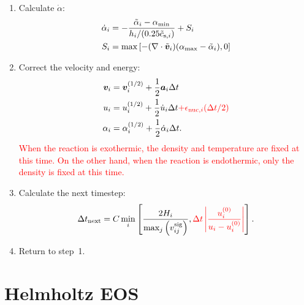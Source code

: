 \documentclass[fleqn,dvipdfmx]{article}
\newcommand{\redtext}[1]{\textcolor{red}{#1}}
\begin{document}
\begin{enumerate}
\item Calculate $\dot{\alpha}$:
  \begin{align}
    \dot{\alpha}_i &= - \frac{\tilde{\alpha}_i - \alpha_{\rm
        min}}{h_i/(0.25\tilde{c}_{{\rm s},i})} + S_i \\ 
    S_i &= \max \left[ -(\nabla \cdot \tilde{\bm{v}}_i)(\alpha_{\rm
        max}-\tilde{\alpha}_i), 0 \right]
  \end{align}

\item Correct the velocity and energy:
  \begin{align}
    \bm{v}_i &= \bm{v}^{(1/2)}_i + \frac{1}{2} \bm{a}_i \Delta t \\
    u_i &= u^{(1/2)}_i + \frac{1}{2} \dot{u}_i \Delta t \redtext{+
      \epsilon_{{\rm nuc},i}(\Delta t / 2)} \\
    \alpha_i &= \alpha^{(1/2)}_i + \frac{1}{2} \dot{\alpha}_i \Delta
    t.
  \end{align}
  \redtext{When the reaction is exothermic, the density and
    temperature are fixed at this time. On the other hand, when the
    reaction is endothermic, only the density is fixed at this time.}

\item Calculate the next timestep:
  \begin{align}
    \Delta t_{\rm next} = C \min_i \left[ \frac{2H_i}{\max_j \left(
        v_{ij}^{\rm sig} \right) }, \redtext{\Delta t \left|
        \frac{u_i^{(0)}}{u_i-u_i^{(0)}} \right|} \right].
  \end{align}

\item Return to step~1.
\end{enumerate}

\section{Helmholtz EOS}
\end{document}
